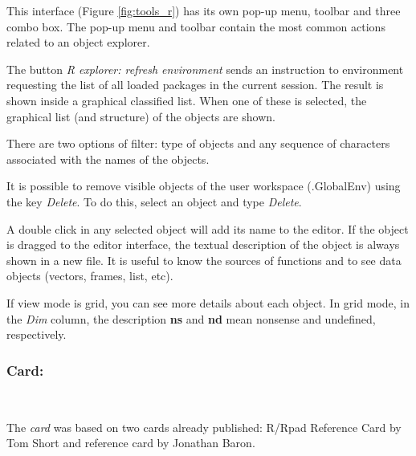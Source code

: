 This interface
(Figure \ref{fig:tools_r})
has its own pop-up menu, toolbar and three combo box. The
pop-up menu and toolbar contain the most common actions related to an object
explorer.

The button \textit{R explorer: refresh environment} sends an instruction to
\RR{} environment requesting the list of all loaded packages in the current
session. The result is shown inside a graphical classified list. When one
of these is selected, the graphical list (and structure) of the objects
are shown.

There are two options of filter: type of objects and any sequence of
characters associated with the names of the objects.

It is possible to remove visible objects of the user workspace (.GlobalEnv)
using the key \textit{Delete}. To do this, select an object and type
\textit{Delete}.

A double click in any selected object will add its name to the editor.
If the object is dragged to the editor interface, the textual description
of the object is always shown in a new file. It is useful to know the
sources of functions and to see data objects (vectors, frames, list, etc).

If view mode is grid, you can see more details about each object. In grid mode,
in the \textit{Dim} column, the description \textbf{ns} and \textbf{nd} mean
nonsense and undefined, respectively.

\subsubsection{Card:}\\

The \textit{card} was based on two \RR{} cards already published:
R/Rpad Reference Card by Tom Short and \RR{} reference card by Jonathan Baron.

